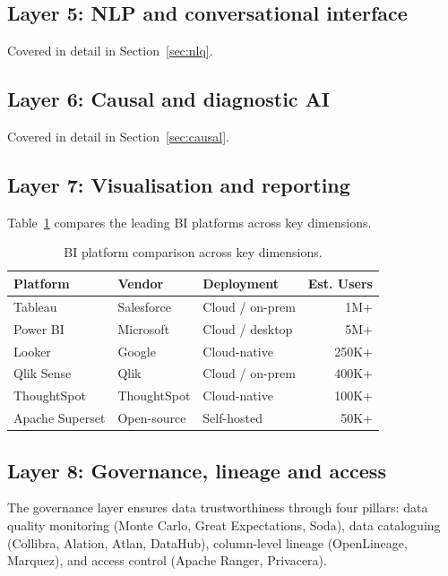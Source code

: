 \documentclass[preprint,12pt,authoryear]{elsarticle}
\theoremstyle{definition}
\begin{document}
\subsection{Layer 5: NLP and conversational interface}

Covered in detail in Section~\ref{sec:nlq}.

\subsection{Layer 6: Causal and diagnostic AI}

Covered in detail in Section~\ref{sec:causal}.

\subsection{Layer 7: Visualisation and reporting}

Table~\ref{tab:bi-platforms} compares the leading BI platforms across key dimensions.

\begin{table}[ht]
\centering
\caption{BI platform comparison across key dimensions.}
\label{tab:bi-platforms}
\begin{tabular}{lllr}
\toprule
\textbf{Platform} & \textbf{Vendor} & \textbf{Deployment} & \textbf{Est. Users} \\
\midrule
Tableau         & Salesforce  & Cloud / on-prem  & 1M+ \\
Power BI        & Microsoft   & Cloud / desktop  & 5M+ \\
Looker          & Google      & Cloud-native     & 250K+ \\
Qlik Sense      & Qlik        & Cloud / on-prem  & 400K+ \\
ThoughtSpot     & ThoughtSpot & Cloud-native     & 100K+ \\
Apache Superset & Open-source & Self-hosted      & 50K+ \\
\bottomrule
\end{tabular}
\end{table}

\subsection{Layer 8: Governance, lineage and access}

The governance layer ensures data trustworthiness through four pillars: data quality monitoring (Monte Carlo, Great Expectations, Soda), data cataloguing (Collibra, Alation, Atlan, DataHub), column-level lineage (OpenLineage, Marquez), and access control (Apache Ranger, Privacera).
\end{document}
